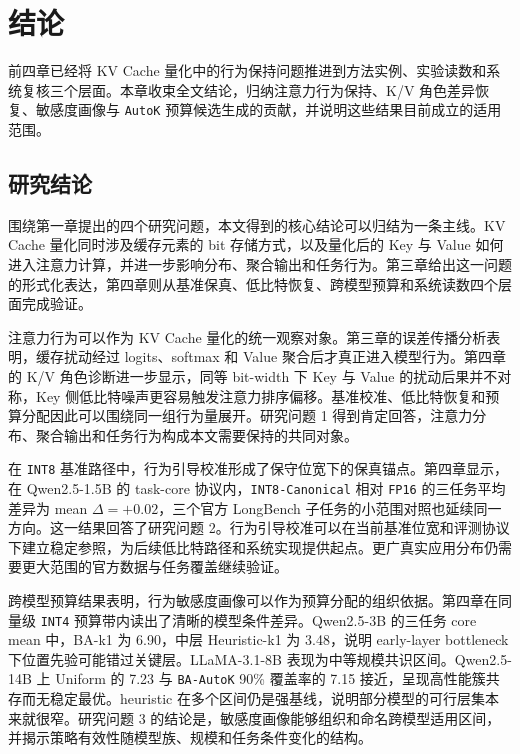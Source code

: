 
\chapter*{结论}
\setcounter{chapter}{5}
\setcounter{section}{0}
\label{chap:conclusion}

前四章已经将 KV Cache 量化中的行为保持问题推进到方法实例、实验读数和系统复核三个层面。本章收束全文结论，归纳注意力行为保持、K/V 角色差异恢复、敏感度画像与 \texttt{AutoK} 预算候选生成的贡献，并说明这些结果目前成立的适用范围。

\section{研究结论}
\label{sec:conclusion-answers}%

围绕第一章提出的四个研究问题，本文得到的核心结论可以归结为一条主线。KV Cache 量化同时涉及缓存元素的 bit 存储方式，以及量化后的 Key 与 Value 如何进入注意力计算，并进一步影响分布、聚合输出和任务行为。第三章给出这一问题的形式化表达，第四章则从基准保真、低比特恢复、跨模型预算和系统读数四个层面完成验证。

注意力行为可以作为 KV Cache 量化的统一观察对象。第三章的误差传播分析表明，缓存扰动经过 logits、softmax 和 Value 聚合后才真正进入模型行为。第四章的 K/V 角色诊断进一步显示，同等 bit-width 下 Key 与 Value 的扰动后果并不对称，Key 侧低比特噪声更容易触发注意力排序偏移。基准校准、低比特恢复和预算分配因此可以围绕同一组行为量展开。研究问题 1 得到肯定回答，注意力分布、聚合输出和任务行为构成本文需要保持的共同对象。

在 \texttt{INT8} 基准路径中，行为引导校准形成了保守位宽下的保真锚点。第四章显示，在 Qwen2.5-1.5B 的 task-core 协议内，\texttt{INT8-Canonical} 相对 \texttt{FP16} 的三任务平均差异为 mean $\Delta=+0.02$，三个官方 LongBench 子任务的小范围对照也延续同一方向。这一结果回答了研究问题 2。行为引导校准可以在当前基准位宽和评测协议下建立稳定参照，为后续低比特路径和系统实现提供起点。更广真实应用分布仍需要更大范围的官方数据与任务覆盖继续验证。

跨模型预算结果表明，行为敏感度画像可以作为预算分配的组织依据。第四章在同量级 \texttt{INT4} 预算带内读出了清晰的模型条件差异。Qwen2.5-3B 的三任务 core mean 中，BA-k1 为 6.90，中层 Heuristic-k1 为 3.48，说明 early-layer bottleneck 下位置先验可能错过关键层。LLaMA-3.1-8B 表现为中等规模共识区间。Qwen2.5-14B 上 Uniform 的 7.23 与 \texttt{BA-AutoK} 90\% 覆盖率的 7.15 接近，呈现高性能簇共存而无稳定最优。heuristic 在多个区间仍是强基线，说明部分模型的可行层集本来就很窄。研究问题 3 的结论是，敏感度画像能够组织和命名跨模型适用区间，并揭示策略有效性随模型族、规模和任务条件变化的结构。

